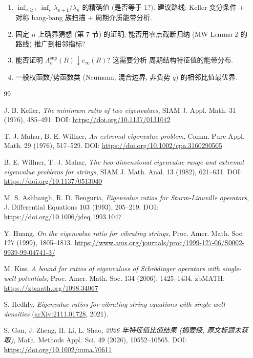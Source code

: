 \documentclass[UTF8]{ctexart}
\begin{document}
\begin{enumerate}
	\item $\inf_{n\geq 1}\inf_{\rho} \lambda_{n+1}/\lambda_n$ 的精确值 (是否等于 $1$?).
		建议路线: Keller 变分条件 + 对称 bang-bang 族扫描 + 周期介质能带分析.
	\item 固定 $n$ 上确界猜想 (第 7 节) 的证明; 能否用零点截断归纳 (MW Lemma 2 的路线) 推广到相邻指标?
	\item 能否证明 $\Lambda_n^{\sup}(R) \downarrow c_{\infty}(R)$? 这需要分析
		周期结构特征值的能带分布.
	\item 一般权函数/势函数类 (Neumann, 混合边界, 非负势 $q$) 的相邻比值最优界.
\end{enumerate}

\begin{thebibliography}{99}

 J. B. Keller, \emph{The minimum ratio of two eigenvalues},
	SIAM J. Appl. Math. 31 (1976), 485--491.
	DOI: \url{https://doi.org/10.1137/0131042}

 T. J. Mahar, B. E. Willner, \emph{An extremal eigenvalue problem},
	Comm. Pure Appl. Math. 29 (1976), 517--529.
	DOI: \url{https://doi.org/10.1002/cpa.3160290505}

 B. E. Willner, T. J. Mahar, \emph{The two-dimensional eigenvalue range
	and extremal eigenvalue problems for strings}, SIAM J. Math. Anal. 13 (1982), 621--631.
	DOI: \url{https://doi.org/10.1137/0513040}

 M. S. Ashbaugh, R. D. Benguria, \emph{Eigenvalue ratios for Sturm-Liouville
	operators}, J. Differential Equations 103 (1993), 205--219.
	DOI: \url{https://doi.org/10.1006/jdeq.1993.1047}

 Y. Huang, \emph{On the eigenvalue ratio for vibrating strings},
	Proc. Amer. Math. Soc. 127 (1999), 1805--1813.
	\url{https://www.ams.org/journals/proc/1999-127-06/S0002-9939-99-04741-3/}

 M. Kiss, \emph{A bound for ratios of eigenvalues of Schr\"odinger operators
	with single-well potentials}, Proc. Amer. Math. Soc. 134 (2006), 1425--1434.
	zbMATH: \url{https://zbmath.org/1098.34067}

 S. Hedhly, \emph{Eigenvalue ratios for vibrating string equations with single-well densities} (\href{https://arxiv.org/abs/2111.01728}{arXiv:2111.01728}, 2021).



 S. Gan, J. Zheng, H. Li, L. Shao, \emph{2026 年特征值比值结果 (摘要级, 原文标题未获取)}, Math. Methods Appl. Sci. 49 (2026), 10552--10565. DOI: \url{https://doi.org/10.1002/mma.70611}




\end{thebibliography}
\end{document}
